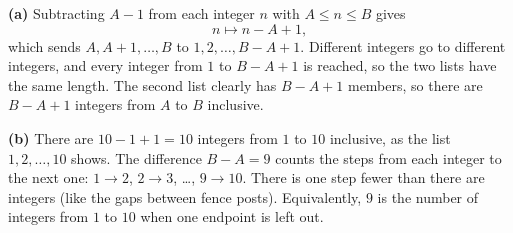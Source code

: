 \textbf{(a)} Subtracting $A-1$ from each integer $n$ with $A\le n\le B$ gives
\[n\longmapsto n-A+1,\]
which sends $A,A+1,\dots,B$ to $1,2,\dots,B-A+1$. Different integers go to different integers, and every integer from $1$ to $B-A+1$ is reached, so the two lists have the same length. The second list clearly has $B-A+1$ members, so there are $B-A+1$ integers from $A$ to $B$ inclusive.

\textbf{(b)} There are $10-1+1=\boxed{10}$ integers from $1$ to $10$ inclusive, as the list $1,2,\dots,10$ shows. The difference $B-A=9$ counts the steps from each integer to the next one: $1\to2$, $2\to3$, \dots, $9\to10$. There is one step fewer than there are integers (like the gaps between fence posts). Equivalently, $9$ is the number of integers from $1$ to $10$ when one endpoint is left out.
